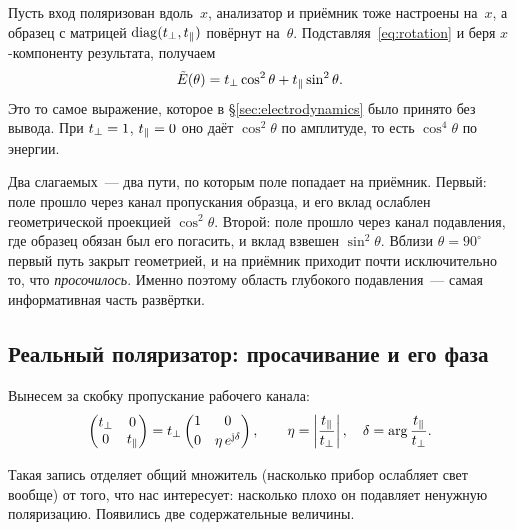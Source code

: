 \begin{strict}
Пусть вход поляризован вдоль~$x$, анализатор и приёмник тоже настроены на~$x$, а образец с
матрицей $\mathrm{diag}(t_{\perp},t_{\parallel})$ повёрнут на~$\theta$. Подставляя~\eqref{eq:rotation} и
беря $x$-компоненту результата, получаем
\begin{equation}
  \tilde{E}(\theta)=t_{\perp}\cos^2\theta+t_{\parallel}\sin^2\theta .
  \label{eq:malus-jones}
\end{equation}
Это то самое выражение, которое в §\ref{sec:electrodynamics} было принято без вывода. При
$t_{\perp}=1$, $t_{\parallel}=0$ оно даёт $\cos^2\theta$ по амплитуде, то есть $\cos^4\theta$ по энергии.
\end{strict}

\begin{intuition}
Два слагаемых~--- два пути, по которым поле попадает на приёмник. Первый: поле прошло через канал
пропускания образца, и его вклад ослаблен геометрической проекцией $\cos^2\theta$. Второй: поле
прошло через канал подавления, где образец обязан был его погасить, и вклад взвешен
$\sin^2\theta$. Вблизи $\theta=90^\circ$ первый путь закрыт геометрией, и на приёмник приходит
почти исключительно то, что \emph{просочилось}. Именно поэтому область глубокого подавления~---
самая информативная часть развёртки.
\end{intuition}

\subsection{Реальный поляризатор: просачивание и его фаза}
\label{subsec:leakage}

Вынесем за скобку пропускание рабочего канала:
\begin{equation}
  \begin{pmatrix}t_{\perp}&0\\0&t_{\parallel}\end{pmatrix}
  =t_{\perp}\begin{pmatrix}1&0\\[2pt]0&\eta\,e^{\mathrm{j}\delta}\end{pmatrix},
  \qquad
  \eta=\left|\frac{t_{\parallel}}{t_{\perp}}\right|,
  \quad
  \delta=\arg\frac{t_{\parallel}}{t_{\perp}}.
  \label{eq:leaky}
\end{equation}

Такая запись отделяет общий множитель (насколько прибор ослабляет свет вообще) от того, что нас
интересует: насколько плохо он подавляет ненужную поляризацию. Появились две содержательные
величины.

